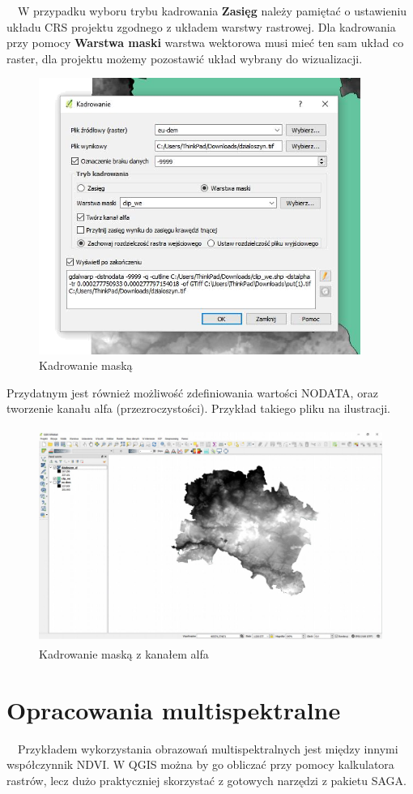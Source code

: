 \documentclass[12pt,a4paper]{book}
\begin{document}
\ \ W przypadku wyboru trybu kadrowania \textbf{Zasięg} należy pamiętać o ustawieniu układu CRS projektu zgodnego z układem warstwy rastrowej. Dla kadrowania przy pomocy \textbf{Warstwa maski} warstwa wektorowa musi mieć ten sam układ co raster, dla projektu możemy pozostawić układ wybrany do wizualizacji.
\begin{figure}[!ht]
	\centering
	\includegraphics[height=9cm]{004-raster-maska.png}
	\caption{Kadrowanie maską}
\end{figure}

Przydatnym jest również możliwość zdefiniowania wartości NODATA, oraz tworzenie kanału alfa (przezroczystości). Przykład takiego pliku na ilustracji.
\begin{figure}[!ht]
	\centering
	\includegraphics[height=7cm]{004-raster-alfa.jpg}
	\caption{Kadrowanie maską z kanałem alfa} \label{fig:maskaalfa}
\end{figure}

\section{Opracowania multispektralne}
\ \ Przykładem wykorzystania obrazowań multispektralnych jest między innymi współczynnik NDVI. W QGIS można by go obliczać przy pomocy kalkulatora rastrów, lecz dużo praktyczniej skorzystać z gotowych narzędzi z pakietu SAGA.
\end{document}
